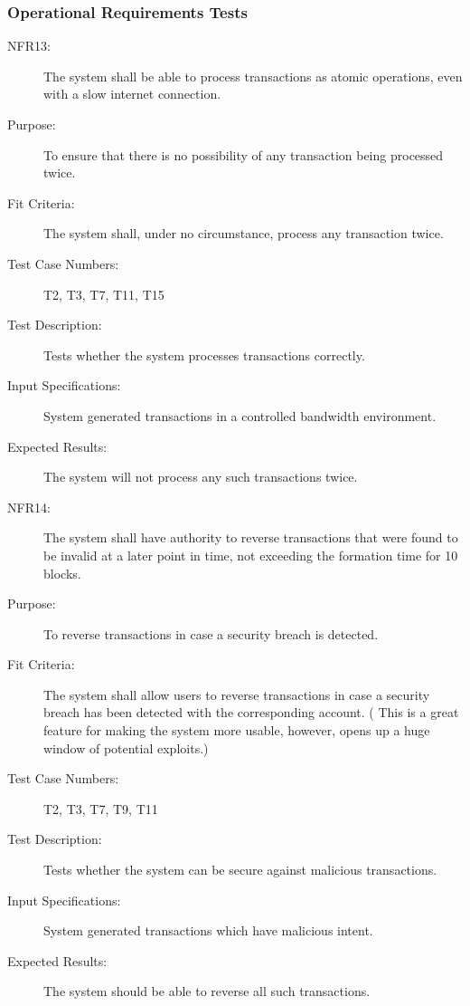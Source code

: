 \documentclass[a4paper,twoside,phd]{BYUPhys}
\begin{document}
\subsubsection{Operational Requirements Tests}
\begin{description}
\item[NFR13:] The system shall be able to process transactions as atomic operations, even with a slow internet connection.
\item[Purpose:] To ensure that there is no possibility of any transaction being processed twice.
\item[Fit Criteria:] The system shall, under no circumstance, process any transaction twice.
\item[Test Case Numbers:] T2, T3, T7, T11, T15
\item[Test Description:] Tests whether the system processes transactions correctly.
\item[Input Specifications:] System generated transactions in a controlled bandwidth environment.
\item[Expected Results:] The system will not process any such transactions twice.

\item[NFR14:] The system shall have authority to reverse transactions that were found to be invalid at a later point in time, not exceeding the formation time for 10 blocks.
\item[Purpose:] To reverse transactions in case a security breach is detected.
\item[Fit Criteria:] The system shall allow users to reverse transactions in case a security breach has been detected with the corresponding account. ( This is a great feature for making the system more usable, however, opens up a huge window of potential exploits.)
\item[Test Case Numbers:] T2, T3, T7, T9, T11
\item[Test Description:] Tests whether the system can be secure against malicious transactions.
\item[Input Specifications:] System generated transactions which have malicious intent.
\item[Expected Results:] The system should be able to reverse all such transactions.


\end{description}
\end{document}
